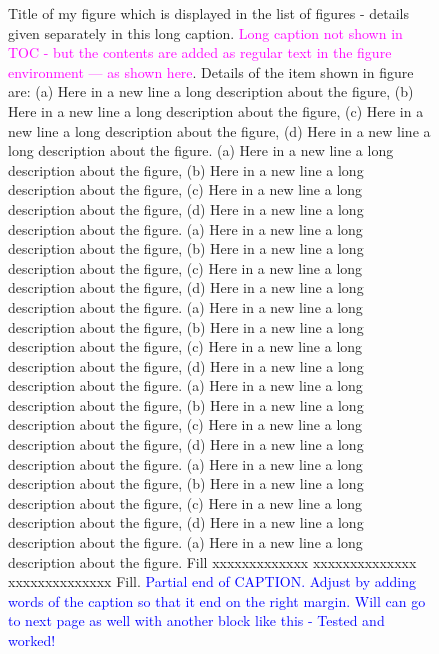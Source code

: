\documentclass[phd]{ndsu-thesis-2022}
\begin{document}
\begin{figure}[p]
\caption[Title of my figure which is displayed in the list of figures - details given separately in this long caption.]{Title of my figure which is displayed in the list of figures - details given separately in this long caption. \textcolor{magenta}{Long caption not shown in TOC - but the contents are added as regular text in the figure environment --- as shown here}. Details of the item shown in figure are: (a) Here in a new line a long description about the figure, (b) Here in a new line a long description about the figure, (c) Here in a new line a long description about the figure, (d) Here in a new line a long description about the figure. (a) Here in a new line a long description about the figure, (b) Here in a new line a long description about the figure, (c) Here in a new line a long description about the figure, (d) Here in a new line a long description about the figure. (a) Here in a new line a long description about the figure, (b) Here in a new line a long description about the figure, (c) Here in a new line a long description about the figure, (d) Here in a new line a long description about the figure. (a) Here in a new line a long description about the figure, (b) Here in a new line a long description about the figure, (c) Here in a new line a long description about the figure, (d) Here in a new line a long description about the figure. (a) Here in a new line a long description about the figure, (b) Here in a new line a long description about the figure, (c) Here in a new line a long description about the figure, (d) Here in a new line a long description about the figure. (a) Here in a new line a long description about the figure, (b) Here in a new line a long description about the figure, (c) Here in a new line a long description about the figure, (d) Here in a new line a long description about the figure. (a) Here in a new line a long description about the figure.  Fill xxxxxxxxxxxxx xxxxxxxxxxxxxx xxxxxxxxxxxxxx Fill. \textcolor{blue}{Partial end of CAPTION. Adjust by adding words of the caption so that it end on the right margin. Will can go to next page as well with another block like this - Tested and worked!}}
\label{figlongcaption}
\end{figure}
\end{document}
